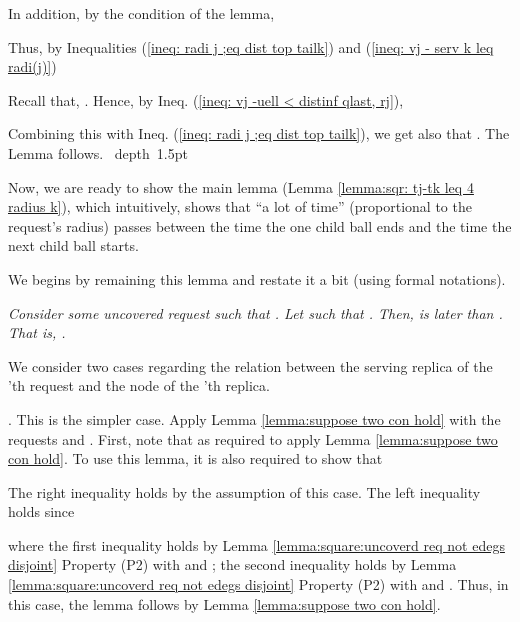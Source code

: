 \documentclass[11pt]{article}
\def\blackslug{\hbox{\hskip 1pt \vrule width 4pt height 8pt
    depth 1.5pt \hskip 1pt}}
\def\QED{\quad\blackslug\lower 8.5pt\null\par}
\begin{document}
In addition, by the condition of the lemma,

Thus, by Inequalities (\ref{ineq: radi j ;eq dist top tailk}) and (\ref{ineq: vj - serv k leq radi(j)})

Recall that, .
Hence, by Ineq. (\ref{ineq: vj -uell < distinf qlast, rj}),

Combining this with Ineq. (\ref{ineq: radi j ;eq dist top tailk}), we get also that .
The Lemma follows.
\QED







Now, we are ready to show the main lemma (Lemma \ref{lemma:sqr: tj-tk leq 4 radius k}), which
intuitively, shows that ``a lot of time'' (proportional to the request's radius)
passes between the time the one child ball ends and the time the next child ball starts.

We begins by remaining this lemma and restate it a bit (using formal notations).



{\em
Consider some uncovered request  such that .
Let  such that .
Then,  is later than .
That is, . }




















\vspace{0.2cm}
We consider two cases regarding the relation between the serving replica  of the 'th request and the node  of the 'th replica.

\vspace{0.5cm}
 . This is the simpler case.
Apply Lemma \ref{lemma:suppose two con hold} with the requests  and .
First, note that  as required to apply Lemma  \ref{lemma:suppose two con hold}.
To use this lemma, it is also required to show that

The right inequality holds by the assumption of this case.
The left inequality holds
since

where the first inequality holds by Lemma \ref{lemma:square:uncoverd req not edegs disjoint} Property (P2) with  and ;
the second inequality holds by Lemma \ref{lemma:square:uncoverd req not edegs disjoint} Property (P2) with  and .
Thus, in this case, the lemma follows by Lemma \ref{lemma:suppose two con hold}.
\end{document}
